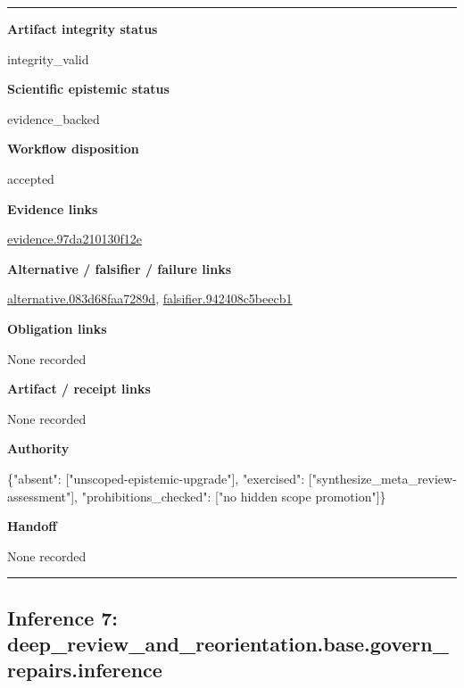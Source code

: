 \documentclass[10pt,a4paper]{article}
\newcommand{\TraceField}[2]{\par\noindent\textbf{#1}\par\noindent #2\par\smallskip}
\newenvironment{TraceDossier}{\par\medskip\noindent\hrule\medskip}{\medskip\hrule\par\medskip}
\begin{document}
\begin{TraceDossier}
\TraceField{Artifact integrity status}{integrity\_\allowbreak{}valid}

\TraceField{Scientific epistemic status}{evidence\_\allowbreak{}backed}

\TraceField{Workflow disposition}{accepted}

\TraceField{Evidence links}{\hyperlink{trace-evidence-4de77c887370014c4c}{evidence.\allowbreak{}97da210130\allowbreak{}f12e}}

\TraceField{Alternative / falsifier / failure links}{\hyperlink{trace-alternative-5f88068f621fbdb9e5}{alternativ\allowbreak{}e.\allowbreak{}083d68faa7\allowbreak{}289d}, \hyperlink{trace-alternative-7561b0e7712d085d4e}{falsifier.\allowbreak{}942408c5be\allowbreak{}ecb1}}

\TraceField{Obligation links}{None recorded}

\TraceField{Artifact / receipt links}{None recorded}

\TraceField{Authority}{\{"absent":\allowbreak{} ["unscoped\allowbreak{}-\allowbreak{}epistemic-\allowbreak{}upgrade"],\allowbreak{} "exercised\allowbreak{}":\allowbreak{} ["synthesi\allowbreak{}ze\_\allowbreak{}meta\_\allowbreak{}review-\allowbreak{}assessment\allowbreak{}"], "prohibiti\allowbreak{}ons\_\allowbreak{}checked":\allowbreak{} ["no hidden scope promotion"\allowbreak{}]\}}

\TraceField{Handoff}{None recorded}

\end{TraceDossier}
\pagebreak[2]\subsection{Inference 7: deep\_\allowbreak{}review\_\allowbreak{}and\_\allowbreak{}reorientat\allowbreak{}ion.\allowbreak{}base.\allowbreak{}govern\_\allowbreak{}repairs.\allowbreak{}inference}\label{trace-inference-13f399e1a3fcb95d93}
\end{document}
